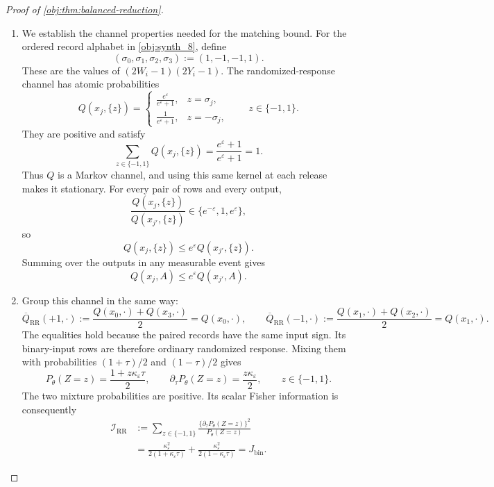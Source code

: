 \begin{proof}[Proof of \cref{obj:thm:balanced-reduction}]
\begin{enumerate}
\item We establish the channel properties needed for the matching
bound. For the ordered record alphabet in \cref{obj:synth_8}, define
\[
(\sigma_0,\sigma_1,\sigma_2,\sigma_3):=(1,-1,-1,1).
\]
These are the values of \((2W_i-1)(2Y_i-1)\).
The randomized-response channel has atomic probabilities
\[
Q(x_j,\{z\})
=
\begin{cases}
\displaystyle\frac{e^\varepsilon}{e^\varepsilon+1},
&z=\sigma_j,\\[6pt]
\displaystyle\frac1{e^\varepsilon+1},
&z=-\sigma_j,
\end{cases}
\qquad z\in\{-1,1\}.
\]
They are positive and satisfy
\[
\sum_{z\in\{-1,1\}}Q(x_j,\{z\})
=\frac{e^\varepsilon+1}{e^\varepsilon+1}=1.
\]
Thus \(Q\) is a Markov channel, and using this same kernel at each
release makes it stationary. For every pair of rows and every output,
\[
\frac{Q(x_j,\{z\})}{Q(x_{j'},\{z\})}
\in\{e^{-\varepsilon},1,e^\varepsilon\},
\]
so
\[
Q(x_j,\{z\})\le e^\varepsilon Q(x_{j'},\{z\}).
\]
Summing over the outputs in any measurable event gives
\[
Q(x_j,A)\le e^\varepsilon Q(x_{j'},A).
\]

\item Group this channel in the same way:
\[
\overline Q_{\mathrm{RR}}(+1,\cdot)
:=\frac{Q(x_0,\cdot)+Q(x_3,\cdot)}2=Q(x_0,\cdot),
\qquad
\overline Q_{\mathrm{RR}}(-1,\cdot)
:=\frac{Q(x_1,\cdot)+Q(x_2,\cdot)}2=Q(x_1,\cdot).
\]
The equalities hold because the paired records have the same input
sign. Its binary-input rows are therefore ordinary randomized response.
Mixing them with probabilities \((1+\tau)/2\) and \((1-\tau)/2\) gives
\[
P_\theta(Z=z)=\frac{1+z\kappa_\varepsilon\tau}{2},
\qquad
\partial_\tau P_\theta(Z=z)=\frac{z\kappa_\varepsilon}{2},
\qquad z\in\{-1,1\}.
\]
The two mixture probabilities are positive. Its scalar Fisher
information is consequently
\[
\begin{aligned}
\mathcal I_{\mathrm{RR}}
&:=
\sum_{z\in\{-1,1\}}
\frac{\{\partial_\tau P_\theta(Z=z)\}^2}{P_\theta(Z=z)}\\
&=
\frac{\kappa_\varepsilon^2}{2(1+\kappa_\varepsilon\tau)}
+\frac{\kappa_\varepsilon^2}{2(1-\kappa_\varepsilon\tau)}
=J_{\mathrm{bin}}.
\end{aligned}
\]


\end{enumerate}
\end{proof}
